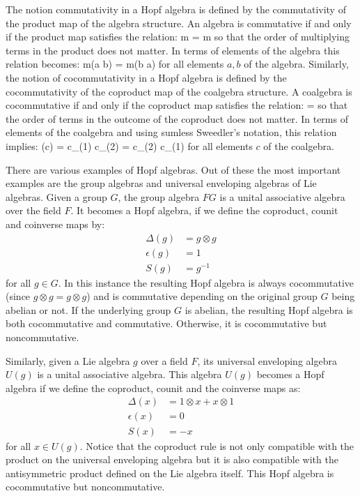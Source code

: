 The notion commutativity in a Hopf algebra is defined by the commutativity of the product
map of the algebra structure. An algebra is commutative if and only if the product map
satisfies the relation:
\beq
m = m \circ \tau
\eeq
so that the order of multiplying terms in the product does not matter. In terms of
elements of the algebra this relation becomes:
\beq
m(a \otimes b) = m(b \otimes a)
\eeq
for all elements $a,b$ of the algebra. Similarly, the
notion of cocommutativity in a Hopf algebra is defined by the cocommutativity of the
coproduct map of the coalgebra structure. A coalgebra is cocommutative if and only if
the coproduct map satisfies the relation:
\beq
\Delta = \tau \circ \Delta
\eeq
so that the order of terms in the outcome of the coproduct does not matter. In
terms of elements of the coalgebra and using sumless Sweedler's notation, this
relation implies:
\beq
\Delta(c) = c_{(1)} \otimes c_{(2)} = c_{(2)} \otimes c_{(1)}
\eeq
for all elements $c$ of the coalgebra.

There are various examples of Hopf algebras. Out of these the most important examples
are the group algebras and universal enveloping algebras of Lie algebras. Given a
group $G$, the group algebra $FG$ is a unital associative algebra over the field $F$.
It becomes a Hopf algebra, if we define the coproduct, counit and coinverse maps by:
\begin{align}
\Delta(g) & = g \otimes g \\
\epsilon(g) & = 1 \\
S(g) & = g^{-1}
\end{align}
for all $g \in G$. In this instance the resulting Hopf algebra is always
cocommutative  (since $g \otimes g = g \otimes g$) and is
commutative depending on the original group $G$ being abelian or not. If the
underlying group $G$ is abelian, the resulting Hopf algebra is both cocommutative
and commutative. Otherwise, it is cocommutative but noncommutative.

Similarly, given a Lie algebra $g$ over a field $F$, its universal enveloping algebra
$U(g)$ is a unital associative algebra. This algebra $U(g)$ becomes a Hopf algebra
if we define the coproduct, counit and the coinverse maps as:
\begin{align}
\Delta(x) & = 1 \otimes x + x \otimes 1 \\
\epsilon(x) & = 0 \\
S(x) & = -x
\end{align}
for all $x \in U(g)$. Notice that the coproduct rule is not only compatible with the
product on the universal enveloping algebra but it is also compatible with the
antisymmetric product defined on the Lie algebra itself. This Hopf algebra is
cocommutative but noncommutative.

